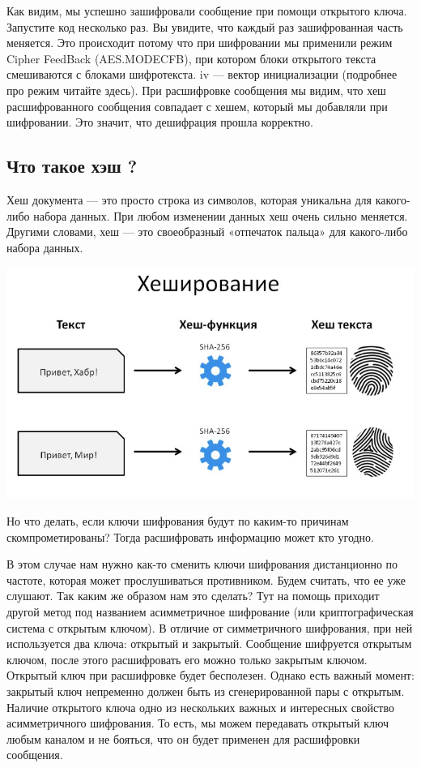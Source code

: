 \documentclass[12pt]{article}
\begin{document}
	Как видим, мы успешно зашифровали сообщение при помощи открытого ключа.
	Запустите код несколько раз. Вы увидите, что каждый раз зашифрованная часть меняется. Это происходит потому что при шифровании мы применили режим Cipher FeedBack (AES.MODECFB), при котором блоки открытого текста смешиваются с блоками шифротекста. iv — вектор инициализации (подробнее про режим читайте здесь). При расшифровке сообщения мы видим, что хеш расшифрованного сообщения совпадает с хешем, который мы добавляли при шифровании. Это значит, что дешифрация прошла корректно.
	
	\vspace{1cm}
	
	\subsection{Что такое хэш ?}
	
	Хеш документа — это просто строка из символов, которая уникальна для какого-либо набора данных. При любом изменении данных хеш очень сильно меняется. Другими словами, хеш — это своеобразный «отпечаток пальца» для какого-либо набора данных.
	
	\begin{center}
		\includegraphics[width=1\linewidth]{pictures/img4.jpg}
	\end{center}

	Но что делать, если ключи шифрования будут по каким-то причинам скомпрометированы? Тогда расшифровать информацию может кто угодно.
	
	\vspace{0.5cm}
	
	В этом случае нам нужно как-то сменить ключи шифрования дистанционно по частоте, которая может прослушиваться противником. Будем считать, что ее уже слушают. Так каким же образом нам это сделать? Тут на помощь приходит другой метод под названием асимметричное шифрование (или криптографическая система с открытым ключом). В отличие от симметричного шифрования, при ней используется два ключа: открытый и закрытый. Сообщение шифруется открытым ключом, после этого расшифровать его можно только закрытым ключом. Открытый ключ при расшифровке будет бесполезен. Однако есть важный момент: закрытый ключ непременно должен быть из сгенерированной пары с открытым. Наличие открытого ключа одно из нескольких важных и интересных свойство асимметричного шифрования. То есть, мы можем передавать открытый ключ любым каналом и не бояться, что он будет применен для расшифровки сообщения.
	
\end{document}
